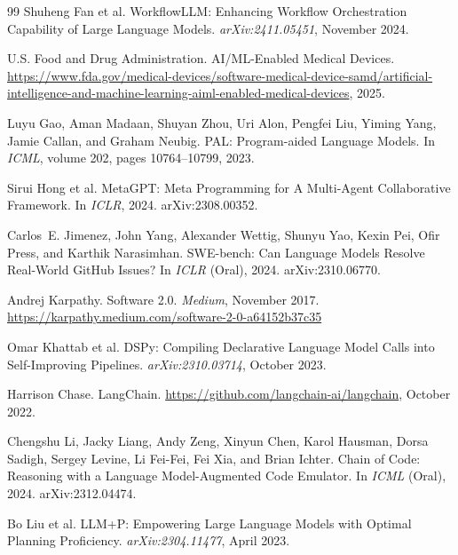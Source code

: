 \documentclass[11pt]{article}
\begin{document}
\begin{thebibliography}{99}
Shuheng Fan et al.
\newblock WorkflowLLM: Enhancing Workflow Orchestration Capability of Large Language Models.
\newblock \emph{arXiv:2411.05451}, November 2024.

U.S. Food and Drug Administration.
\newblock AI/ML-Enabled Medical Devices.
\newblock \url{https://www.fda.gov/medical-devices/software-medical-device-samd/artificial-intelligence-and-machine-learning-aiml-enabled-medical-devices}, 2025.

Luyu Gao, Aman Madaan, Shuyan Zhou, Uri Alon, Pengfei Liu, Yiming Yang, Jamie Callan, and Graham Neubig.
\newblock PAL: Program-aided Language Models.
\newblock In \emph{ICML}, volume 202, pages 10764--10799, 2023.

Sirui Hong et al.
\newblock MetaGPT: Meta Programming for A Multi-Agent Collaborative Framework.
\newblock In \emph{ICLR}, 2024.
\newblock arXiv:2308.00352.

Carlos~E. Jimenez, John Yang, Alexander Wettig, Shunyu Yao, Kexin Pei, Ofir Press, and Karthik Narasimhan.
\newblock SWE-bench: Can Language Models Resolve Real-World GitHub Issues?
\newblock In \emph{ICLR} (Oral), 2024.
\newblock arXiv:2310.06770.

Andrej Karpathy.
\newblock Software 2.0.
\newblock \emph{Medium}, November 2017.
\newblock \url{https://karpathy.medium.com/software-2-0-a64152b37c35}

Omar Khattab et al.
\newblock DSPy: Compiling Declarative Language Model Calls into Self-Improving Pipelines.
\newblock \emph{arXiv:2310.03714}, October 2023.

Harrison Chase.
\newblock LangChain.
\newblock \url{https://github.com/langchain-ai/langchain}, October 2022.

Chengshu Li, Jacky Liang, Andy Zeng, Xinyun Chen, Karol Hausman, Dorsa Sadigh, Sergey Levine, Li Fei-Fei, Fei Xia, and Brian Ichter.
\newblock Chain of Code: Reasoning with a Language Model-Augmented Code Emulator.
\newblock In \emph{ICML} (Oral), 2024.
\newblock arXiv:2312.04474.

Bo Liu et al.
\newblock LLM+P: Empowering Large Language Models with Optimal Planning Proficiency.
\newblock \emph{arXiv:2304.11477}, April 2023.


\end{thebibliography}
\end{document}
